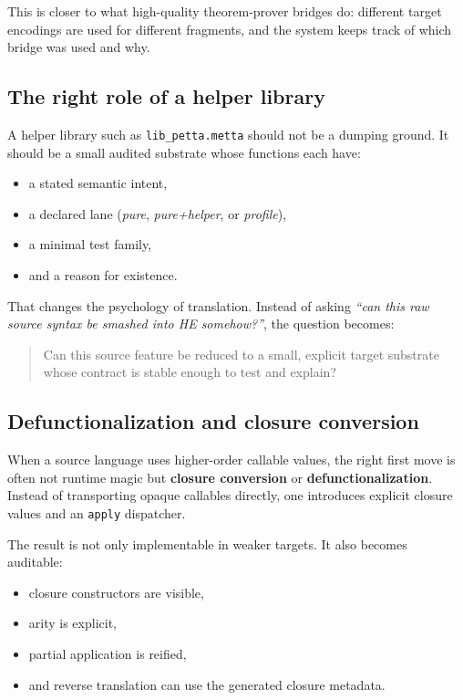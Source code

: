 \documentclass[11pt]{article}
\begin{document}
This is closer to what high-quality theorem-prover bridges do: different target encodings are used for different fragments, and the system keeps track of which bridge was used and why.

\subsection{The right role of a helper library}

A helper library such as \texttt{lib\_petta.metta} should not be a dumping ground. It should be a small audited substrate whose functions each have:
\begin{itemize}
    \item a stated semantic intent,
    \item a declared lane (\emph{pure}, \emph{pure+helper}, or \emph{profile}),
    \item a minimal test family,
    \item and a reason for existence.
\end{itemize}

That changes the psychology of translation. Instead of asking \emph{``can this raw source syntax be smashed into HE somehow?''}, the question becomes:

\begin{quote}
Can this source feature be reduced to a small, explicit target substrate whose contract is stable enough to test and explain?
\end{quote}

\subsection{Defunctionalization and closure conversion}

When a source language uses higher-order callable values, the right first move is often not runtime magic but \textbf{closure conversion} or \textbf{defunctionalization}. Instead of transporting opaque callables directly, one introduces explicit closure values and an \texttt{apply} dispatcher.

The result is not only implementable in weaker targets. It also becomes auditable:
\begin{itemize}
    \item closure constructors are visible,
    \item arity is explicit,
    \item partial application is reified,
    \item and reverse translation can use the generated closure metadata.
\end{itemize}
\end{document}
